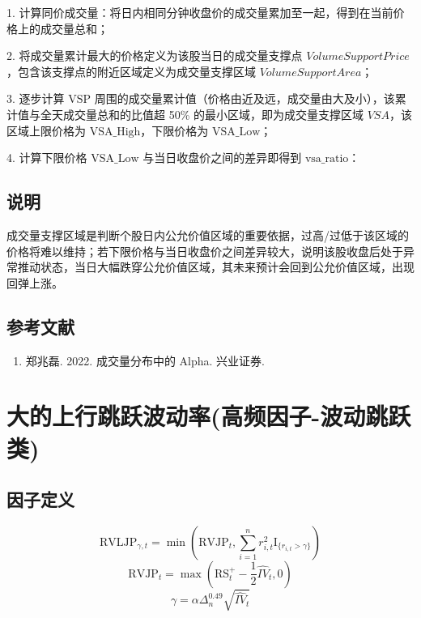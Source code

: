 \documentclass{article}
\begin{document}
1. 计算同价成交量：将日内相同分钟收盘价的成交量累加至一起，得到在当前价格上的成交量总和；

2. 将成交量累计最大的价格定义为该股当日的成交量支撑点 \( VolumeSupportPrice \)，包含该支撑点的附近区域定义为成交量支撑区域 \( VolumeSupportArea \)；

3. 逐步计算 \( \mathrm{VSP} \) 周围的成交量累计值（价格由近及远，成交量由大及小），该累计值与全天成交量总和的比值超 50\% 的最小区域，即为成交量支撑区域 \( VSA \)，该区域上限价格为 \( \mathrm{VSA\_High} \)，下限价格为 \( \mathrm{VSA\_Low} \)；

4. 计算下限价格 \( \mathrm{VSA\_Low} \) 与当日收盘价之间的差异即得到 \( \mathrm{vsa\_ratio} \)：

\subsection{说明}
成交量支撑区域是判断个股日内公允价值区域的重要依据，过高/过低于该区域的价格将难以维持；若下限价格与当日收盘价之间差异较大，说明该股收盘后处于异常推动状态，当日大幅跌穿公允价值区域，其未来预计会回到公允价值区域，出现回弹上涨。

\subsection{参考文献}
\begin{enumerate}
    \item 郑兆磊. 2022. 成交量分布中的 Alpha. 兴业证券.
\end{enumerate}

\section{大的上行跳跃波动率(高频因子-波动跳跃类)}

\subsection{因子定义}
\begin{equation}
    \mathrm{RVLJP}_{\gamma,t} = \min\left(\mathrm{RVJP}_t, \sum_{i=1}^n r_{i,t}^2 \mathrm{I}_{\{r_{i,t} > \gamma\}}\right)
\end{equation}
\begin{equation}
    \mathrm{RVJP}_t = \max\left(\mathrm{RS}_t^+ - \frac{1}{2} \hat{IV}_t, 0\right)
\end{equation}
\begin{equation}
    \gamma = \alpha \Delta_n^{0.49} \sqrt{\hat{IV}_t}
\end{equation}
\end{document}
